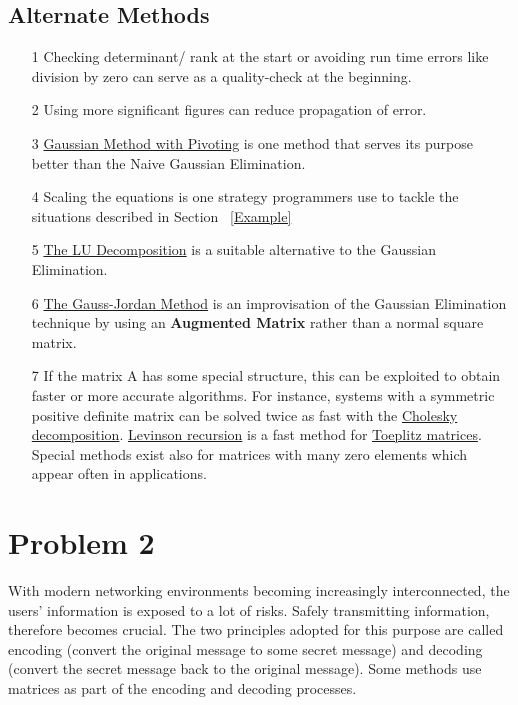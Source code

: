 \documentclass[titlepage, 11pt]{article}
\begin{document}
\subsection{Alternate Methods}
\label{alt:Alternative}
\begin{itemize}
    \item [1] Checking determinant/ rank at the start or avoiding run time errors like division by zero can serve as a quality-check at the beginning. 
    \item [2] Using more significant figures can reduce propagation of error. 
    \item [3] \href{https://web.mit.edu/10.001/Web/Course_Notes/GaussElimPivoting.html}{Gaussian Method with Pivoting} is one method that serves its purpose better than the Naive Gaussian Elimination. 
    \item [4] Scaling the equations is one strategy programmers use to tackle the situations described in Section ~\ref{Example}
    \item [5] \href{https://en.wikipedia.org/wiki/LU_decomposition}{The LU Decomposition} is a suitable alternative to the Gaussian Elimination. 
    \item [6] \href{https://math.libretexts.org/Bookshelves/Applied_Mathematics/Applied_Finite_Mathematics_(Sekhon_and_Bloom)/02%3A_Matrices/2.02%3A_Systems_of_Linear_Equations_and_the_Gauss-Jordan_Method}{The Gauss-Jordan Method} is an improvisation of the Gaussian Elimination technique by using an \textbf{Augmented Matrix} rather than a normal square matrix. 
    \item [7] If the matrix A has some special structure, this can be exploited to obtain faster or more accurate algorithms. For instance, systems with a symmetric positive definite matrix can be solved twice as fast with the \href{https://en.wikipedia.org/wiki/Cholesky_decomposition}{Cholesky decomposition}. \href{https://en.wikipedia.org/wiki/Levinson_recursion}{Levinson recursion} is a fast method for \href{https://en.wikipedia.org/wiki/Toeplitz_matrix}{Toeplitz matrices}. Special methods exist also for matrices with many zero elements which appear often in applications.
\end{itemize}

\newpage
\section{Problem 2}
\noindent With modern networking environments becoming increasingly interconnected, the users' information is exposed to a lot of risks. Safely transmitting information, therefore becomes crucial. The two principles adopted for this purpose are called encoding (convert the original message to some secret message) and decoding (convert the secret message back to the original message). Some methods use matrices as part of the encoding and decoding processes.
\end{document}
